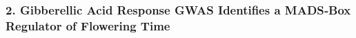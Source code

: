 \documentclass[10pt,letterpaper]{article}
\begin{document}
\begin{itemize}


\subsubsection*{2. Gibberellic Acid Response GWAS Identifies a MADS‑Box Regulator of Flowering Time}


\end{itemize}
\end{document}
